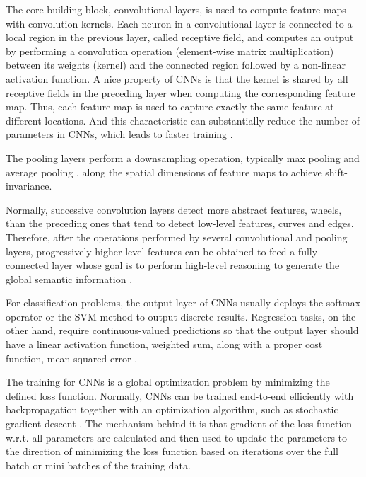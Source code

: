 \documentclass[a4paper,12pt]{article}
\begin{document}
The core building block, convolutional layers, is used to compute feature maps with convolution kernels. Each neuron in a convolutional layer is connected to a local region in the previous layer, called receptive field, and computes an output by performing a convolution operation (element-wise matrix multiplication) between its weights (kernel) and the connected region followed by a non-linear activation function. A nice property of CNNs is that the kernel  is shared by all receptive fields in the preceding layer when computing the corresponding feature map. Thus, each feature map is used to capture exactly the same feature at different locations. And this characteristic can substantially reduce the number of parameters in CNNs, which leads to faster training \cite{nndd}.  

The pooling layers perform a downsampling operation, typically max pooling \cite{Boureau:2010} and average pooling \cite{6460871}, along the spatial dimensions of feature maps to achieve shift-invariance. 

Normally, successive convolution layers detect more abstract features, \eg wheels, than the preceding ones that tend to detect low-level features, \eg curves and edges. Therefore, after the operations performed by several convolutional and pooling layers, progressively higher-level features can be obtained to feed a fully-connected layer whose goal is to perform high-level reasoning to generate the global semantic information \cite{DBLP:SimonyanZ14a, DBLP:abs-1207-0580}.

For classification problems, the output layer of CNNs usually deploys the softmax operator \cite{DBLP:Russakovsky14} or the SVM method \cite{DBLP:Tang13} to output discrete results. Regression tasks, on the other hand, require continuous-valued predictions so that the output layer should have a linear activation function, \eg weighted sum, along with a proper cost function, \eg mean squared error \cite{DBLP:ZhouHSZ16}.

The training for CNNs is a global optimization problem by minimizing the defined loss function. Normally, CNNs can be trained end-to-end efficiently with backpropagation together with an optimization algorithm, such as stochastic gradient descent \cite{5597822}. The mechanism behind it is that gradient of the loss function w.r.t. all parameters are calculated and then used to update the parameters to the direction of minimizing the loss function based on iterations over the full batch or mini batches of the training data.
\end{document}
